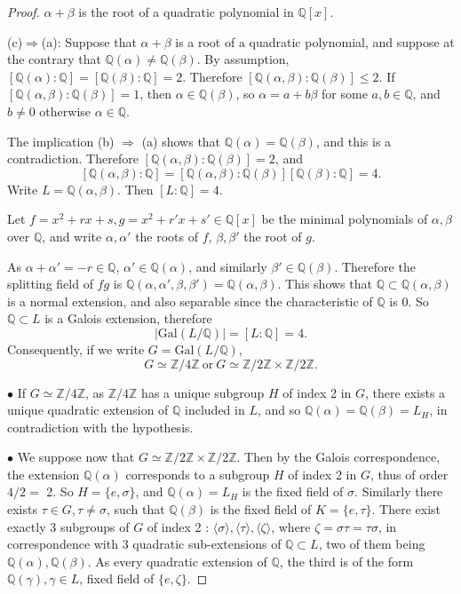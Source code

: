 \documentclass[11pt,a4paper]{article}
\newcommand{\Q}{\mathbb{Q}}
\newcommand{\Z}{\mathbb{Z}}
\newcommand{\Gal}{\mathrm{Gal}}
\begin{document}
\begin{proof}
$\alpha + \beta$ is the root of a quadratic polynomial in $\Q[x]$.

\bigskip

(c)$\Rightarrow$(a):
Suppose that $\alpha + \beta$ is a root of a quadratic polynomial, and suppose at the contrary that $\Q(\alpha) \ne \Q(\beta)$.
By assumption, $[\Q(\alpha) : \Q] = [\Q(\beta):\Q] = 2$. Therefore $[\Q(\alpha,\beta) : \Q(\beta)] \leq 2$. If $[\Q(\alpha,\beta) : \Q(\beta)] = 1$, then $\alpha \in \Q(\beta)$, so $\alpha = a + b \beta$ for some $a,b \in \Q$, and $b\ne 0$ otherwise $\alpha \in \Q$.

 The implication (b) $\Rightarrow $ (a) shows that $\Q(\alpha) = \Q(\beta)$, and this is a contradiction. Therefore $[\Q(\alpha,\beta) : \Q(\beta)] = 2$, and
$$[\Q(\alpha,\beta) : \Q] = [\Q(\alpha,\beta) : \Q(\beta)] [\Q(\beta) : \Q] = 4.$$
Write $L = \Q(\alpha,\beta)$. Then $[L :\Q]=4$.

Let $f = x^2 +rx+s,g = x^2+r'x+s'  \in \Q[x]$ be the minimal polynomials of $\alpha,\beta$ over $\Q$, and write $\alpha, \alpha'$ the roots of $f$, $\beta, \beta'$ the root of $g$.

As $\alpha+\alpha'= -r \in \Q$, $\alpha' \in \Q(\alpha)$, and similarly $\beta' \in \Q(\beta)$. Therefore the splitting field of $fg$ is $\Q(\alpha,\alpha',\beta,\beta') = \Q(\alpha,\beta)$.  This shows that $\Q \subset \Q(\alpha,\beta)$ is a normal extension, and also separable since the characteristic of $\Q$ is 0. So $\Q \subset L$ is a Galois extension, therefore
$$ \vert \Gal(L/\Q) \vert = [L:\Q]=4.$$
Consequently, if we write $G =  \Gal(L/\Q)$,
$$G \simeq \Z/4\Z \ \mathrm{or}\ G \simeq \Z/2\Z \times \Z/2\Z.$$

$\bullet$ If $G \simeq \Z/4\Z$, as $ \Z/4\Z$ has a unique subgroup $H$ of index 2 in $G$, there exists a unique quadratic extension of $\Q$ included in $L$, and so $\Q(\alpha) = \Q(\beta) = L_H$, in contradiction with the hypothesis.

$\bullet$ We suppose now that $G \simeq \Z/2\Z \times \Z/2\Z$. Then by the Galois correspondence, the extension $\Q(\alpha)$ corresponds to a subgroup $H$ of index 2 in $G$, thus of order $4/2 =$ 2. So $H = \{e,\sigma\}$, and $\Q(\alpha) = L_H$ is the fixed field of $\sigma$. Similarly there exists $\tau \in G, \tau \neq \sigma$, such that $\Q(\beta)$ is the fixed field of $K = \{e ,\tau\}$.
There exist exactly 3 subgroups of $G$ of index 2 : $\langle \sigma \rangle, \langle \tau \rangle,\langle \zeta \rangle$, where $\zeta = \sigma \tau = \tau \sigma$,  in correspondence with 3 quadratic sub-extensions of $\Q \subset L$,  two of them being $\Q(\alpha), \Q(\beta)$. As every quadratic extension of $\Q$, the third is of the form $\Q(\gamma), \gamma \in L$, fixed field of $\{e,\zeta\}$.


\end{proof}
\end{document}
